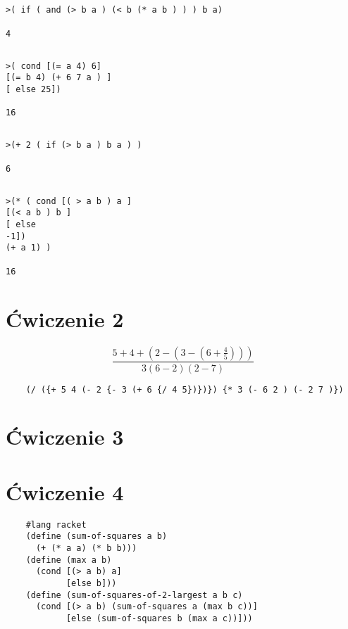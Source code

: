 \documentclass[a4paper]{article}
\begin{document}
\subsection{}
\begin{lstlisting}
>( if ( and (> b a ) (< b (* a b ) ) ) b a)

4
\end{lstlisting}
\subsection{}
\begin{lstlisting}
>( cond [(= a 4) 6]
[(= b 4) (+ 6 7 a ) ]
[ else 25])

16
\end{lstlisting}
\subsection{}
\begin{lstlisting}
>(+ 2 ( if (> b a ) b a ) )

6
\end{lstlisting}
\subsection{}
\begin{lstlisting}
>(* ( cond [( > a b ) a ]
[(< a b ) b ]
[ else
-1])
(+ a 1) )

16
\end{lstlisting}

\section{Ćwiczenie 2}
\begin{center}
    $$ \frac{5+4+(2-(3-(6+\frac{4}{5})))}{3(6-2)(2-7)} $$
\begin{lstlisting}
    (/ ({+ 5 4 (- 2 {- 3 (+ 6 {/ 4 5})})}) {* 3 (- 6 2 ) (- 2 7 )})
\end{lstlisting}
\end{center}
\section{Ćwiczenie 3}
\clearpage
\section{Ćwiczenie 4}
\begin{lstlisting}
    #lang racket
    (define (sum-of-squares a b)
      (+ (* a a) (* b b)))
    (define (max a b)
      (cond [(> a b) a]
            [else b]))
    (define (sum-of-squares-of-2-largest a b c)
      (cond [(> a b) (sum-of-squares a (max b c))]
            [else (sum-of-squares b (max a c))]))
\end{lstlisting}
\end{document}
